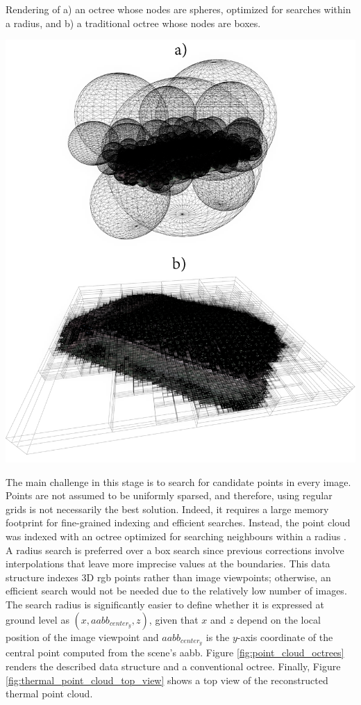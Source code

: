 \begin{marginfigure}[.0cm]
	\caption{Rendering of a) an octree whose nodes are spheres, optimized for searches within a radius, and b) a traditional octree whose nodes are boxes. }
	\label{fig:point_cloud_octrees}
	\includegraphics{figs/thermal_projection/octrees.png}
\end{marginfigure}
The main challenge in this stage is to search for candidate points in every image. Points are not assumed to be uniformly sparsed, and therefore, using regular grids is not necessarily the best solution. Indeed, it requires a large memory footprint for fine-grained indexing and efficient searches. Instead, the point cloud was indexed with an octree optimized for searching neighbours within a radius \cite{behley_efficient_2015}. A radius search is preferred over a box search since previous corrections involve interpolations that leave more imprecise values at the boundaries. This data structure indexes 3D \acrshort{rgb} points rather than image viewpoints; otherwise, an efficient search would not be needed due to the relatively low number of images. The search radius is significantly easier to define whether it is expressed at ground level as $(x, \textit{aabb}_{\textit{center}_{y}}, z)$, given that $x$ and $z$ depend on the local position of the image viewpoint and $\textit{aabb}_{\textit{center}_{y}}$ is the $y$-axis coordinate of the central point computed from the scene's \acrshort{aabb}. Figure \ref{fig:point_cloud_octrees} renders the described data structure and a conventional octree. Finally, Figure \ref{fig:thermal_point_cloud_top_view} shows a top view of the reconstructed thermal point cloud.

